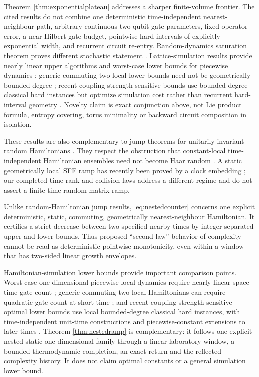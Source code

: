 Theorem \ref{thm:exponentialplateau} addresses a sharper finite-volume
frontier.  The cited results do not combine one deterministic
time-independent nearest-neighbour path, arbitrary continuous two-qubit gate
parameters, fixed operator error, a near-Hilbert gate budget, pointwise hard
intervals of explicitly exponential width, and recurrent circuit re-entry.
Random-dynamics saturation theorem proves different stochastic statement
\cite{OszmaniecEtAl2024}.  Lattice-simulation results provide nearly linear
upper algorithms and worst-case lower bounds for piecewise dynamics
\cite{ChildsSu2019,HaahEtAl2023}; generic commuting two-local lower bounds
need not be geometrically bounded degree \cite{LowEtAl2023}; recent
coupling-strength-sensitive bounds use bounded-degree classical hard instances but
optimize simulation cost rather than recurrent hard-interval geometry
\cite{ZlokapaEtAl2026}.  Novelty claim is exact conjunction above, not Lie
product formula, entropy covering, torus minimality or backward circuit
composition in isolation.

These results are also complementary to jump theorems for unitarily invariant
random Hamiltonians \cite{KotowskiOszmaniecHorodecki2025}.  They respect the obstruction that
constant-local time-independent Hamiltonian ensembles need not become Haar
random \cite{CuiEtAl2025}.  A static geometrically local SFF ramp has recently
been proved by a clock embedding \cite{Ippoliti2026}; our completed-time rank
and collision laws address a different regime and do not assert a finite-time
random-matrix ramp.

Unlike random-Hamiltonian jump results, \eqref{eq:nestedcounter} concerns one
explicit deterministic, static, commuting, geometrically nearest-neighbour
Hamiltonian.  It certifies a strict decrease between two specified nearby
times by integer-separated upper and lower bounds.  Thus proposed
``second-law'' behavior of complexity \cite{BrownSusskind2018} cannot be read
as deterministic pointwise monotonicity, even within a window that has
two-sided linear growth envelopes.

Hamiltonian-simulation lower bounds provide important comparison points.
Worst-case one-dimensional piecewise local dynamics require nearly linear
space--time gate count \cite{HaahEtAl2023}; generic commuting two-local
Hamiltonians can require quadratic gate count at short time
\cite{LowEtAl2023}; and recent coupling-strength-sensitive optimal lower bounds use
local bounded-degree classical hard instances, with time-independent
unit-time constructions and piecewise-constant extensions to later times
\cite{ZlokapaEtAl2026}.  Theorem \ref{thm:nestedramp} is complementary: it
follows one explicit nested static one-dimensional family through a linear
laboratory window, a bounded thermodynamic completion, an exact return and
the reflected complexity history.  It does not claim optimal constants or a
general simulation lower bound.

